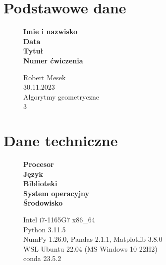 \documentclass[12pt]{article}
\begin{document}
\section*{Podstawowe dane}
\begin{figure}[htp]
	\begin{minipage}[t]{0.3\textwidth}
		\textbf{Imie i nazwisko} \\
		\textbf{Data} \\
		\textbf{Tytuł} \\
		\textbf{Numer ćwiczenia}
	\end{minipage}%
	\begin{minipage}[t]{0.6\textwidth}
		Robert Mesek \\
		30.11.2023 \\
		Algorytmy geometryczne \\
		3
	\end{minipage}%
\end{figure}

\section*{Dane techniczne}
\begin{figure}[htp]
	\begin{minipage}[t]{0.3\textwidth}
		\textbf{Procesor} \\
		\textbf{Język} \\
		\textbf{Biblioteki} \\
		\textbf{System operacyjny} \\
		\textbf{Środowisko}

	\end{minipage}%
	\begin{minipage}[t]{0.6\textwidth}
		Intel i7-1165G7 x86\_64 \\
		Python 3.11.5 \\
		NumPy 1.26.0, Pandas 2.1.1, Matplotlib 3.8.0 \\
		WSL Ubuntu 22.04 (MS Windows 10 22H2) \\
		conda 23.5.2
	\end{minipage}%
\end{figure}
\end{document}
